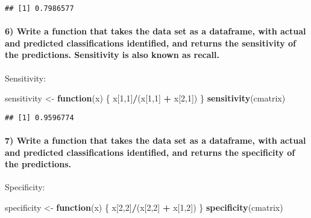 \documentclass[]{article}
\newenvironment{Shaded}{\begin{snugshade}}{\end{snugshade}}
\newcommand{\KeywordTok}[1]{\textcolor[rgb]{0.13,0.29,0.53}{\textbf{#1}}}
\newcommand{\DecValTok}[1]{\textcolor[rgb]{0.00,0.00,0.81}{#1}}
\newcommand{\StringTok}[1]{\textcolor[rgb]{0.31,0.60,0.02}{#1}}
\newcommand{\ControlFlowTok}[1]{\textcolor[rgb]{0.13,0.29,0.53}{\textbf{#1}}}
\newcommand{\OperatorTok}[1]{\textcolor[rgb]{0.81,0.36,0.00}{\textbf{#1}}}
\newcommand{\NormalTok}[1]{#1}
\let\oldparagraph\paragraph
\renewcommand{\paragraph}[1]{\oldparagraph{#1}\mbox{}}
\begin{document}
\begin{verbatim}
## [1] 0.7986577
\end{verbatim}

\paragraph{6) Write a function that takes the data set as a dataframe,
with actual and predicted classifications identified, and returns the
sensitivity of the predictions. Sensitivity is also known as
recall.}\label{write-a-function-that-takes-the-data-set-as-a-dataframe-with-actual-and-predicted-classifications-identified-and-returns-the-sensitivity-of-the-predictions.-sensitivity-is-also-known-as-recall.}

Sensitivity:

\begin{Shaded}
\begin{Highlighting}[]
\NormalTok{sensitivity <-}\StringTok{ }\ControlFlowTok{function}\NormalTok{(x) \{}
\NormalTok{  x[}\DecValTok{1}\NormalTok{,}\DecValTok{1}\NormalTok{]}\OperatorTok{/}\NormalTok{(x[}\DecValTok{1}\NormalTok{,}\DecValTok{1}\NormalTok{] }\OperatorTok{+}\StringTok{ }\NormalTok{x[}\DecValTok{2}\NormalTok{,}\DecValTok{1}\NormalTok{])}
\NormalTok{\}}
\KeywordTok{sensitivity}\NormalTok{(cmatrix)}
\end{Highlighting}
\end{Shaded}

\begin{verbatim}
## [1] 0.9596774
\end{verbatim}

\paragraph{7) Write a function that takes the data set as a dataframe,
with actual and predicted classifications identified, and returns the
specificity of the
predictions.}\label{write-a-function-that-takes-the-data-set-as-a-dataframe-with-actual-and-predicted-classifications-identified-and-returns-the-specificity-of-the-predictions.}

Specificity:

\begin{Shaded}
\begin{Highlighting}[]
\NormalTok{specificity <-}\StringTok{ }\ControlFlowTok{function}\NormalTok{(x) \{}
\NormalTok{  x[}\DecValTok{2}\NormalTok{,}\DecValTok{2}\NormalTok{]}\OperatorTok{/}\NormalTok{(x[}\DecValTok{2}\NormalTok{,}\DecValTok{2}\NormalTok{] }\OperatorTok{+}\StringTok{ }\NormalTok{x[}\DecValTok{1}\NormalTok{,}\DecValTok{2}\NormalTok{])}
\NormalTok{\}}
\KeywordTok{specificity}\NormalTok{(cmatrix)}
\end{Highlighting}
\end{Shaded}
\end{document}
